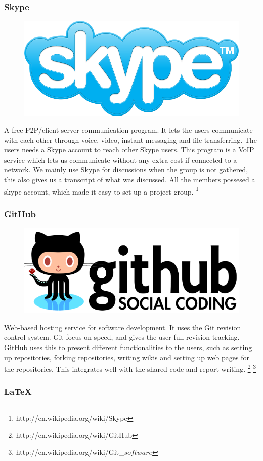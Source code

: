 \subsubsection{Skype}

\begin{figure}
\vspace{-30pt}
\centering
\includegraphics[width = .20\textwidth]{image/skype-logo.png}
\end{figure}

A free P2P/client-server communication program. It lets the users communicate with each other through voice, video, instant messaging and file transferring. The users needs a Skype account to reach other Skype users. This program is a VoIP service which lets us communicate without any extra cost if connected to a network. We mainly use Skype for discussions when the group is not gathered, this also gives us a transcript of what was discussed. All the members possesed a skype account, which made it easy to set up a project group.
\footnote{http://en.wikipedia.org/wiki/Skype}

\subsubsection{GitHub}

\begin{figure}
\vspace{-30pt}
\centering
\includegraphics[width = .20\textwidth]{image/github-logo.png}
\end{figure}

Web-based hosting service for software development. It uses the Git revision control system. Git focus on speed, and gives the user full revision tracking. GitHub uses this to present different functionalities to the users, such as setting up repositories, forking repositories, writing wikis and setting up web pages for the repositories. This integrates well with the shared code and report writing.
\footnote{http://en.wikipedia.org/wiki/GitHub}
\footnote{http://en.wikipedia.org/wiki/Git\_\(software\)}

\subsubsection{LaTeX}

